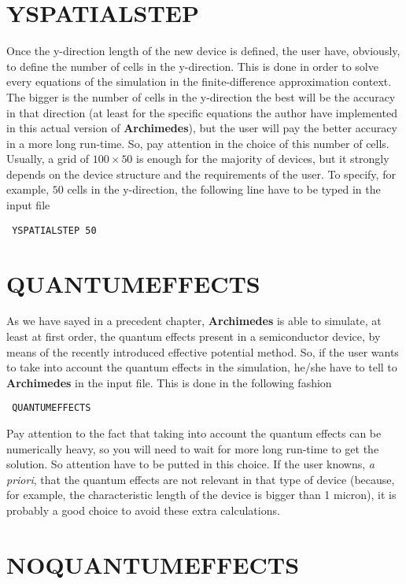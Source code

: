\documentclass[12pt]{book}
\begin{document}
\section{YSPATIALSTEP}

Once the y-direction length of the new device is defined, the user have, obviously, to define the number of cells in the y-direction. This is done in order to solve every equations of the simulation in the finite-difference approximation context. The bigger is the number of cells in the y-direction the best will be the accuracy in that direction (at least for the specific equations the author have implemented in this actual version of \textbf{Archimedes}), but the user will pay the better accuracy in a more long run-time. So, pay attention in the choice of this number of cells. Usually, a grid of $100 \times 50$ is enough for the majority of devices, but it strongly depends on the device structure and the requirements of the user. To specify, for example, $50$ cells in the y-direction, the following line have to be typed in the input file
\begin{verbatim}
 YSPATIALSTEP 50
\end{verbatim}

\section{QUANTUMEFFECTS}

As we have sayed in a precedent chapter, \textbf{Archimedes} is able to simulate, at least at first order, the quantum effects present in a semiconductor device, by means of the recently introduced effective potential method. So, if the user wants to take into account the quantum effects in the simulation, he/she have to tell to \textbf{Archimedes} in the input file. This is done in the following fashion
\begin{verbatim}
 QUANTUMEFFECTS
\end{verbatim}
Pay attention to the fact that taking into account the quantum effects can be numerically heavy, so you will need to wait for more long run-time to get the solution. So attention have to be putted in this choice. If the user knowns, \textsl{a priori}, that the quantum effects are not relevant in that type of device (because, for example, the characteristic length of the device is bigger than 1 micron), it is probably a good choice to avoid these extra calculations.

\section{NOQUANTUMEFFECTS}
\end{document}
